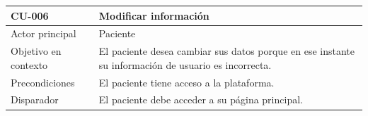
\begin{table}[htpb]
\centering
\begin{tabularx}{\textwidth}{|X|X|}
\hline
\textbf{CU-006}                            & \textbf{Modificar información}                                                                                                                                                                                                                                                                                                                                                                                                                                                                                \\ \hline
Actor principal                   & Paciente                                                                                                                                                                                                                                                                                                                                                                                                                                                                                             \\ \hline
Objetivo en contexto              & El paciente desea cambiar sus datos porque en ese instante su información de usuario es incorrecta.                                                                                                                                                                                                                                                                                                                                                                                                   \\ \hline
Precondiciones                    & El paciente tiene acceso a la plataforma.                                                                                                                                                                                                                                                                                                                                                                                                                                                             \\ \hline
Disparador                        & El paciente debe acceder a su página principal.                                                                                                                                                                                                                                                                                                                                                                                                                                                       \\ \hline

\end{tabularx}
\end{table}
